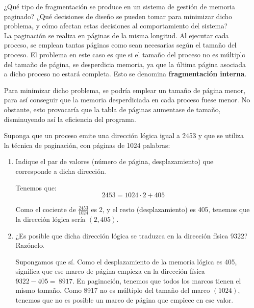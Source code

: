 \begin{ejercicio}\label{ej:2.Ejercicio17}
    ¿Qué tipo de fragmentación se produce en un sistema de gestión de memoria paginado? ¿Qué decisiones de diseño se pueden tomar para minimizar dicho problema, y cómo afectan estas decisiones al comportamiento del sistema?\\

    La paginación se realiza en páginas de la misma longitud. Al ejecutar cada proceso, se emplean tantas páginas como sean necesarias según el tamaño del proceso. El problema en este caso es que si el tamaño del proceso no es múltiplo del tamaño de página, se desperdicia memoria, ya que la última página asociada a dicho proceso no estará completa. Esto se denomina \textbf{fragmentación interna}.

    Para minimizar dicho problema, se podría emplear un tamaño de página menor, para así conseguir que la memoria desperdiciada en cada proceso fuese menor. No obstante, esto provocaría que la tabla de páginas aumentase de tamaño, disminuyendo así la eficiencia del programa.
\end{ejercicio}

\begin{ejercicio}\label{ej:2.Ejercicio18}
    Suponga que un proceso emite una dirección lógica igual a 2453 y que se utiliza la técnica de paginación, con páginas de 1024 palabras:
    \begin{enumerate}
        \item Indique el par de valores (número de página, desplazamiento) que corresponde a dicha dirección.

        Tenemos que:
        \begin{equation*}
            2453=1024\cdot 2 + 405
        \end{equation*}

        Como el cociente de $\frac{2453}{1024}$ es 2, y el resto (desplazamiento) es 405, tenemos que la dirección lógica sería $(2,405)$.

        \item ¿Es posible que dicha dirección lógica se traduzca en la dirección física 9322? Razónelo.

        Supongamos que sí. Como el desplazamiento de la memoria lógica es 405, significa que ese marco de página empieza en la dirección física $9322-405=~8917$.
        En paginación, tenemos que todos los marcos tienen el mismo tamaño. Como 8917 no es múltiplo del tamaño del marco $(1024)$, tenemos que no es posible un marco de página que empiece en ese valor.
    \end{enumerate}
\end{ejercicio}

